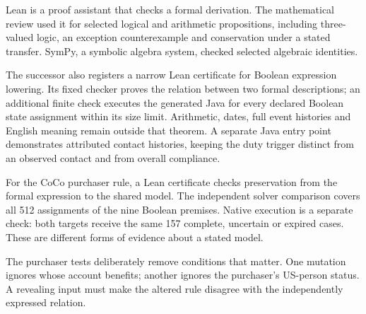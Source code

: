 \clearpage
{}
Lean is a proof assistant that checks a formal derivation. The mathematical
review used it for selected logical and arithmetic propositions, including
three-valued logic, an exception counterexample and conservation under a stated
transfer. SymPy, a symbolic algebra system, checked selected algebraic identities.

\begin{MapDiagram}
\end{MapDiagram}

The successor also registers a narrow Lean certificate for Boolean expression
lowering. Its fixed checker proves the relation between two formal descriptions;
an additional finite check executes the generated Java for every declared
Boolean state assignment within its size limit. Arithmetic, dates, full event
histories and English meaning remain outside that theorem. A separate Java
entry point demonstrates attributed contact histories, keeping the duty trigger
distinct from an observed contact and from overall compliance.

For the CoCo purchaser rule, a Lean certificate checks preservation from the
formal expression to the shared model. The independent solver comparison covers
all 512 assignments of the nine Boolean premises. Native execution is a
separate check: both targets receive the same 157 complete, uncertain or
expired cases. These are different forms of evidence about a stated model.

The purchaser tests deliberately remove conditions that matter. One mutation
ignores whose account benefits; another ignores the purchaser's US-person
status. A revealing input must make the altered rule disagree with the
independently expressed relation.

